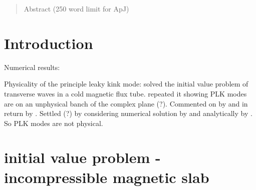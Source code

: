 \documentclass{aastex61}
\begin{document}

\author[0000-0002-0771-743X]{Matthew Allcock}

\author[0000-0003-3439-4127]{Robert Erd\'{e}lyi}


\begin{abstract}

Abstract (250 word limit for ApJ)

\end{abstract}


\section{Introduction} \label{sec:intro}
Numerical results: \cite{ter_etal06}

Physicality of the principle leaky kink mode: \cite{cal03} solved the initial value problem of transverse waves in a cold magnetic flux tube. \cite{rud_etal06} repeated it showing PLK modes are on an unphysical banch of the complex plane (?). Commented on by \cite{cal06} and in return by \cite{rud_etal06b}. Settled (?) by considering numerical solution by \cite{ter_etal07} and analytically by \cite{and_etal07}. So PLK modes are not physical.

\section{initial value problem - incompressible magnetic slab}
\end{document}
